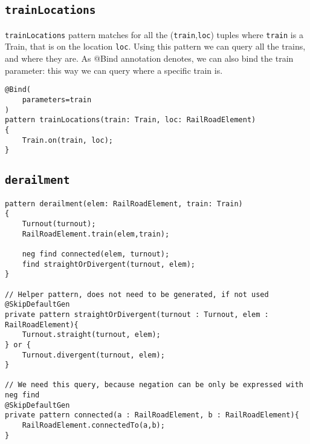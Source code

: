\subsection{\texttt{trainLocations}}
\begin{minipage}{\textwidth}

\texttt{trainLocations} pattern matches for all the (\texttt{train},\texttt{loc}) tuples where \texttt{train} is a Train, that is on the location \texttt{loc}.
Using this pattern we can query all the trains, and where they are.
As @Bind annotation denotes, we can also bind the train parameter: this way we can query where a specific train is.
\begin{lstlisting}[language = vql]
@Bind(
	parameters=train
)
pattern trainLocations(train: Train, loc: RailRoadElement)
{
	Train.on(train, loc);
}
\end{lstlisting}
\end{minipage}
\vspace{\belowdisplayskip}




\subsection{\texttt{derailment}}
\begin{minipage}{\textwidth}
	
\begin{lstlisting}[language = vql]
pattern derailment(elem: RailRoadElement, train: Train)
{
	Turnout(turnout);
	RailRoadElement.train(elem,train);
	
	neg find connected(elem, turnout);
	find straightOrDivergent(turnout, elem);
}

// Helper pattern, does not need to be generated, if not used
@SkipDefaultGen
private pattern straightOrDivergent(turnout : Turnout, elem : RailRoadElement){
	Turnout.straight(turnout, elem);
} or {
	Turnout.divergent(turnout, elem);
}

// We need this query, because negation can be only be expressed with neg find
@SkipDefaultGen
private pattern connected(a : RailRoadElement, b : RailRoadElement){
	RailRoadElement.connectedTo(a,b);
}


\end{lstlisting}
\end{minipage}
\vspace{\belowdisplayskip}


